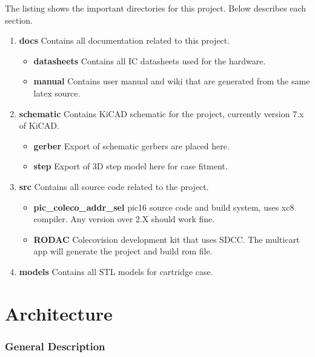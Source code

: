 \documentclass{article}
\begin{document}
  \vspace{\baselineskip}

  \par
  The listing shows the important directories for this project. Below describes each section.

  \begin{enumerate}
    \item \textbf{docs} Contains all documentation related to this project.
      \begin{itemize}
        \item \textbf{datasheets} Contains all IC datasheets used for the hardware.
        \item \textbf{manual} Contains user manual and wiki that are generated from the same latex source.
      \end{itemize}
    \item \textbf{schematic} Contains KiCAD schematic for the project, currently version 7.x of KiCAD.
      \begin{itemize}
        \item \textbf{gerber} Export of schematic gerbers are placed here.
        \item \textbf{step} Export of 3D step model here for case fitment.
      \end{itemize}
    \item \textbf{src} Contains all source code related to the project.
      \begin{itemize}
        \item \textbf{pic\_coleco\_addr\_sel} pic16 source code and build system, uses xc8 compiler. Any version over 2.X should work fine.
        \item \textbf{RODAC} Colecovision development kit that uses SDCC. The multicart app will generate the project and build rom file.
      \end{itemize}
    \item \textbf{models} Contains all STL models for cartridge case.
  \end{enumerate}

  \newpage

  \section{Architecture}
  \subsubsection{General Description}
\end{document}
